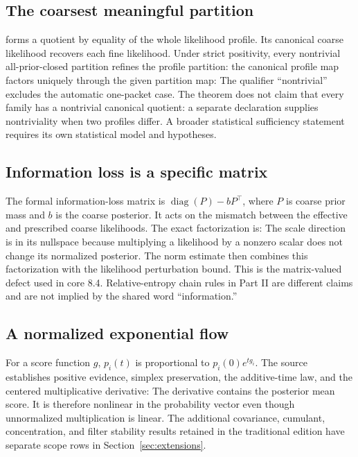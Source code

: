 \subsection{The coarsest meaningful partition}
 forms a quotient by equality of the whole likelihood profile. Its canonical coarse likelihood recovers each fine likelihood. Under strict positivity, every nontrivial all-prior-closed partition refines the profile partition: the canonical profile map factors uniquely through the given partition map:
The qualifier ``nontrivial'' excludes the automatic one-packet case. The theorem does not claim that every family has a nontrivial canonical quotient: a separate declaration supplies nontriviality when two profiles differ. A broader statistical sufficiency statement requires its own statistical model and hypotheses.

\subsection{Information loss is a specific matrix}
The formal information-loss matrix is $\operatorname{diag}(P)-bP^\top$, where $P$ is coarse prior mass and $b$ is the coarse posterior. It acts on the mismatch between the effective and prescribed coarse likelihoods. The exact factorization is:
The scale direction is in its nullspace because multiplying a likelihood by a nonzero scalar does not change its normalized posterior. The norm estimate then combines this factorization with the likelihood perturbation bound. This is the matrix-valued defect used in core 8.4. Relative-entropy chain rules in Part II are different claims and are not implied by the shared word ``information.''

\subsection{A normalized exponential flow}
For a score function $g$, $p_i(t)$ is proportional to $p_i(0)e^{tg_i}$. The source establishes positive evidence, simplex preservation, the additive-time law, and the centered multiplicative derivative:
The derivative contains the posterior mean score. It is therefore nonlinear in the probability vector even though unnormalized multiplication is linear. The additional covariance, cumulant, concentration, and filter stability results retained in the traditional edition have separate scope rows in Section~\ref{sec:extensions}.
